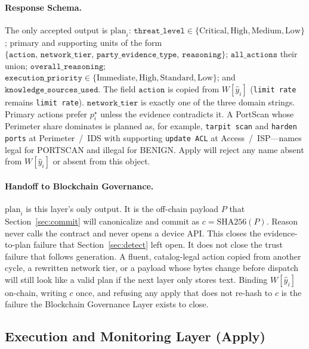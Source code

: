 \paragraph{Response Schema.}
The only accepted output is $\mathrm{plan}_i$: $\mathtt{threat\_level}\in\{\mathrm{Critical},\mathrm{High},\mathrm{Medium},\mathrm{Low}\}$; primary and supporting units of the form $\{\mathtt{action},\,\mathtt{network\_tier},\,\mathtt{party\_evidence\_type},\,\mathtt{reasoning}\}$; $\mathtt{all\_actions}$ their union; $\mathtt{overall\_reasoning}$; $\mathtt{execution\_priority}\in\{\mathrm{Immediate},\mathrm{High},\mathrm{Standard},\mathrm{Low}\}$; and $\mathtt{knowledge\_sources\_used}$. The field $\mathtt{action}$ is copied from $W[\hat{y}_i]$ (\texttt{limit rate} remains \texttt{limit rate}). $\mathtt{network\_tier}$ is exactly one of the three domain strings. Primary actions prefer $p_i^{\star}$ unless the evidence contradicts it. A PortScan whose Perimeter share dominates is planned as, for example, \texttt{tarpit scan} and \texttt{harden ports} at Perimeter~/~IDS with supporting \texttt{update ACL} at Access~/~ISP---names legal for PORTSCAN and illegal for BENIGN. Apply will reject any name absent from $W[\hat{y}_i]$ or absent from this object.

\paragraph{Handoff to Blockchain Governance.}
$\mathrm{plan}_i$ is this layer's only output. It is the off-chain payload $P$ that Section~\ref{sec:commit} will canonicalize and commit as $c=\mathrm{SHA256}(P)$. Reason never calls the contract and never opens a device API. This closes the evidence-to-plan failure that Section~\ref{sec:detect} left open. It does not close the trust failure that follows generation. A fluent, catalog-legal action copied from another cycle, a rewritten network tier, or a payload whose bytes change before dispatch will still look like a valid plan if the next layer only stores text. Binding $W[\hat{y}_i]$ on-chain, writing $c$ once, and refusing any apply that does not re-hash to $c$ is the failure the Blockchain Governance Layer exists to close.



\subsection{Execution and Monitoring Layer (Apply)}
\label{sec:apply}

